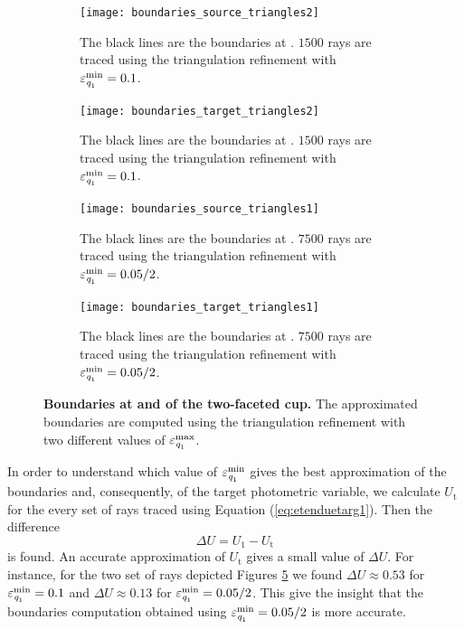 \begin{figure}[h!]
\centering
\begin{subfigure}{.45\textwidth}
  \texttt{[image: boundaries\_source\_triangles2]}
 \caption{The black lines are the boundaries at . $1500$ rays are traced using the triangulation refinement with $\varepsilon_{\textit{q}_1}^{\textrm{min}}=0.1$. }
  \label{fig:boundary_s2}
\end{subfigure}%
\hfill
\begin{subfigure}{.45\textwidth}
  \texttt{[image: boundaries\_target\_triangles2]}
  \caption{The black lines are the boundaries at . $1500$ rays are traced using the triangulation refinement with $\varepsilon_{\textit{q}_1}^{\textrm{min}}=0.1$.} %
  \label{fig:boundaries_t2}
\end{subfigure} %
\hfill
\begin{subfigure}{.45\textwidth}
  \texttt{[image: boundaries\_source\_triangles1]}
  \caption{The black lines are the boundaries at . $7500$ rays are traced using the triangulation refinement with $\varepsilon_{\textit{q}_1}^{\textrm{min}}=0.05/2$.}
  \label{fig:boundaries_s1}
\end{subfigure}%
\hfill
\begin{subfigure}{.45\textwidth}
  \texttt{[image: boundaries\_target\_triangles1]}
 \caption{The black lines are the boundaries at . $7500$ rays are traced using the triangulation refinement with $\varepsilon_{\textit{q}_1}^{\textrm{min}}=0.05/2$.} %
  \label{fig:boundaries_t1}
\end{subfigure}
\caption{\textbf{Boundaries at  and  of the two-faceted cup.} The approximated boundaries are computed using the triangulation refinement with two different values of $\varepsilon_{\textit{q}_1}^{\textrm{max}}$.}
\label{fig:boundaries_cup}
\end{figure} 
In order to understand which value of  $\varepsilon_{\textit{q}_1}^{\textrm{min}}$ gives the best approximation of the boundaries and, consequently, of the target photometric variable, we calculate $U_{\textrm{t}}$ for the every set of rays traced using Equation (\ref{eq:etenduetarg1}). Then the difference 
\begin{equation}\label{eq:delta} \Delta U = U_1-U_{\textrm{t}} 
\end{equation} is found.
An accurate approximation of $U_{\textrm{t}}$ gives a small value of $\Delta U$. 
For instance, for the two set of rays depicted Figures \ref{fig:boundaries_cup} we found $\Delta U \approx 0.53 $ for $\varepsilon_{\textit{q}_1}^{\textrm{min}} = 0.1$ and $\Delta U \approx 0.13 $ for $\varepsilon_{\textit{q}_1}^{\textrm{min}} = 0.05/2$. This give the insight that the boundaries computation obtained using $\varepsilon_{\textit{q}_1}^{\textrm{min}} = 0.05/2$ is more accurate.
